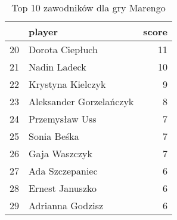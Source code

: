 
\begin{table}[h]
\caption{Top 10 zawodników dla gry Marengo}\label{tab:top10_3}
\centering
\begin{tabular}{rlr}
\hline
    & player                  &   score \\
\hline
 20 & Dorota Ciepłuch         &      11 \\
 21 & Nadin Ladeck            &      10 \\
 22 & Krystyna Kielczyk       &       9 \\
 23 & Aleksander Gorzelańczyk &       8 \\
 24 & Przemysław Uss          &       7 \\
 25 & Sonia Beśka             &       7 \\
 26 & Gaja Waszczyk           &       7 \\
 27 & Ada Szczepaniec         &       6 \\
 28 & Ernest Januszko         &       6 \\
 29 & Adrianna Godzisz        &       6 \\
\hline
\end{tabular}
\end{table}
